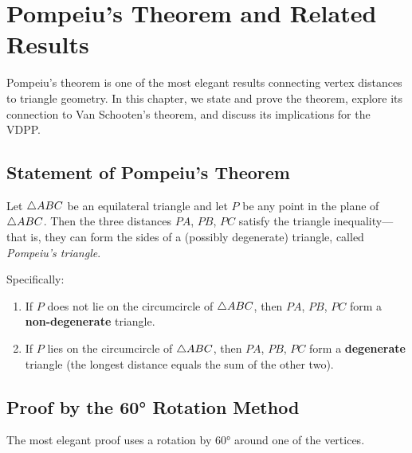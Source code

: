 
\chapter{Pompeiu's Theorem and Related Results}
\label{ch:pompeiu}

Pompeiu's theorem is one of the most elegant results connecting vertex distances to triangle geometry. In this chapter, we state and prove the theorem, explore its connection to Van Schooten's theorem, and discuss its implications for the VDPP.

\section{Statement of Pompeiu's Theorem}

\begin{theorem}
\label{thm:pompeiu}
Let $\triangle ABC$ be an equilateral triangle and let $P$ be any point in the plane of $\triangle ABC$. Then the three distances $PA$, $PB$, $PC$ satisfy the triangle inequality---that is, they can form the sides of a (possibly degenerate) triangle, called \emph{Pompeiu's triangle}.

Specifically:
\begin{enumerate}[label=(\roman*)]
    \item If $P$ does not lie on the circumcircle of $\triangle ABC$, then $PA$, $PB$, $PC$ form a \textbf{non-degenerate} triangle.
    \item If $P$ lies on the circumcircle of $\triangle ABC$, then $PA$, $PB$, $PC$ form a \textbf{degenerate} triangle (the longest distance equals the sum of the other two).
\end{enumerate}
\end{theorem}

\section{Proof by the 60° Rotation Method}

The most elegant proof uses a rotation by $60°$ around one of the vertices.

